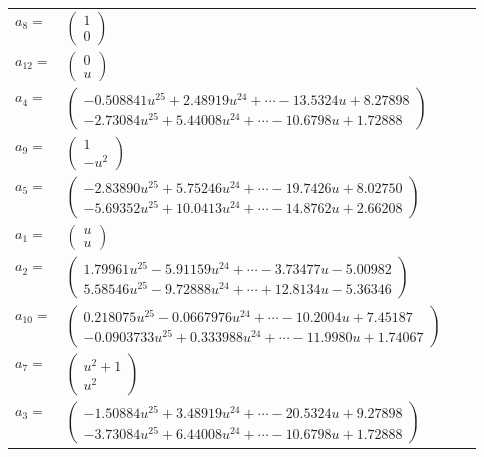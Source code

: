 \documentclass[1p]{elsarticle_modified}
\theoremstyle{definition}
\begin{document}
\begin{tabular}{m{7pt} m{180pt} m{7pt} m{180pt} }
\flushright $a_{8}=$&$\begin{pmatrix}1\\0\end{pmatrix}$ \\
\flushright $a_{12}=$&$\begin{pmatrix}0\\u\end{pmatrix}$ \\
\flushright $a_{4}=$&$\begin{pmatrix}-0.508841 u^{25}+2.48919 u^{24}+\cdots-13.5324 u+8.27898\\-2.73084 u^{25}+5.44008 u^{24}+\cdots-10.6798 u+1.72888\end{pmatrix}$ \\
\flushright $a_{9}=$&$\begin{pmatrix}1\\- u^2\end{pmatrix}$ \\
\flushright $a_{5}=$&$\begin{pmatrix}-2.83890 u^{25}+5.75246 u^{24}+\cdots-19.7426 u+8.02750\\-5.69352 u^{25}+10.0413 u^{24}+\cdots-14.8762 u+2.66208\end{pmatrix}$ \\
\flushright $a_{1}=$&$\begin{pmatrix}u\\u\end{pmatrix}$ \\
\flushright $a_{2}=$&$\begin{pmatrix}1.79961 u^{25}-5.91159 u^{24}+\cdots-3.73477 u-5.00982\\5.58546 u^{25}-9.72888 u^{24}+\cdots+12.8134 u-5.36346\end{pmatrix}$ \\
\flushright $a_{10}=$&$\begin{pmatrix}0.218075 u^{25}-0.0667976 u^{24}+\cdots-10.2004 u+7.45187\\-0.0903733 u^{25}+0.333988 u^{24}+\cdots-11.9980 u+1.74067\end{pmatrix}$ \\
\flushright $a_{7}=$&$\begin{pmatrix}u^2+1\\u^2\end{pmatrix}$ \\
\flushright $a_{3}=$&$\begin{pmatrix}-1.50884 u^{25}+3.48919 u^{24}+\cdots-20.5324 u+9.27898\\-3.73084 u^{25}+6.44008 u^{24}+\cdots-10.6798 u+1.72888\end{pmatrix}$ \\

\end{tabular}
\end{document}
